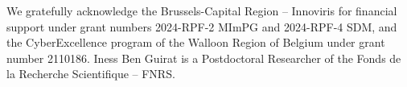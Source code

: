 \documentclass[runningheads]{llncs}
\begin{document}









\begin{credits}
\subsubsection{\ackname}
We gratefully acknowledge the Brussels-Capital Region – Innoviris for
financial support under grant numbers 2024-RPF-2 MImPG and 2024-RPF-4 SDM,
and the CyberExcellence program of the Walloon Region of Belgium under
grant number 2110186. Iness Ben Guirat is a Postdoctoral Researcher of the
Fonds de la Recherche Scientifique – FNRS.
\end{credits}



\end{document}
